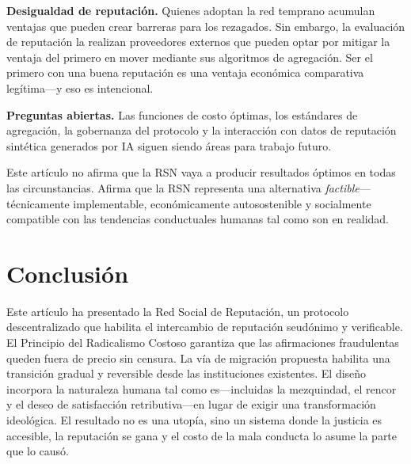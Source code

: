 \documentclass[11pt,a4paper,twocolumn]{article}
\begin{document}
\textbf{Desigualdad de reputación.} Quienes adoptan la red temprano acumulan ventajas que pueden crear barreras para los rezagados. Sin embargo, la evaluación de reputación la realizan proveedores externos que pueden optar por mitigar la ventaja del primero en mover mediante sus algoritmos de agregación. Ser el primero con una buena reputación es una ventaja económica comparativa legítima---y eso es intencional.

\textbf{Preguntas abiertas.} Las funciones de costo óptimas, los estándares de agregación, la gobernanza del protocolo y la interacción con datos de reputación sintética generados por IA siguen siendo áreas para trabajo futuro.

Este artículo no afirma que la RSN vaya a producir resultados óptimos en todas las circunstancias. Afirma que la RSN representa una alternativa \emph{factible}---técnicamente implementable, económicamente autosostenible y socialmente compatible con las tendencias conductuales humanas tal como son en realidad.

\section{Conclusión}

Este artículo ha presentado la Red Social de Reputación, un protocolo descentralizado que habilita el intercambio de reputación seudónimo y verificable. El Principio del Radicalismo Costoso garantiza que las afirmaciones fraudulentas queden fuera de precio sin censura. La vía de migración propuesta habilita una transición gradual y reversible desde las instituciones existentes. El diseño incorpora la naturaleza humana tal como es---incluidas la mezquindad, el rencor y el deseo de satisfacción retributiva---en lugar de exigir una transformación ideológica. El resultado no es una utopía, sino un sistema donde la justicia es accesible, la reputación se gana y el costo de la mala conducta lo asume la parte que lo causó.


\end{document}
